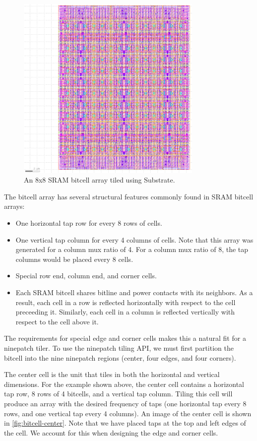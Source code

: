 \begin{figure}[H] \centering
\includegraphics[width=0.8\textwidth]{figures/bitcell8x8.png}
\caption{An 8x8 SRAM bitcell array tiled using Substrate. \label{fig:bitcell8x8}}
\end{figure}

The bitcell array has several structural features commonly found in SRAM bitcell arrays:
\begin{itemize}
\item One horizontal tap row for every 8 rows of cells.
\item One vertical tap column for every 4 columns of cells. Note that this array was
  generated for a column mux ratio of 4. For a column mux ratio of 8, the tap columns
  would be placed every 8 cells.
\item Special row end, column end, and corner cells.
\item Each SRAM bitcell shares bitline and power contacts with its neighbors.
  As a result, each cell in a row is reflected horizontally with respect to the cell preceeding it.
  Similarly, each cell in a column is reflected vertically with respect to the cell above it.
\end{itemize}

The requirements for special edge and corner cells makes this a natural fit for a ninepatch tiler.
To use the ninepatch tiling API, we must first partition the bitcell into the nine ninepatch regions (center, four edges, and four corners).

The center cell is the unit that tiles in both the horizontal and vertical dimensions. For the example shown above,
the center cell contains a horizontal tap row, 8 rows of 4 bitcells, and a vertical tap column. Tiling this cell
will produce an array with the desired frequency of taps (one horizontal tap every 8 rows, and one vertical tap every 4 columns).
An image of the center cell is shown in \ref{fig:bitcell-center}. Note that we have placed taps at the top and left edges of the cell.
We account for this when designing the edge and corner cells.

